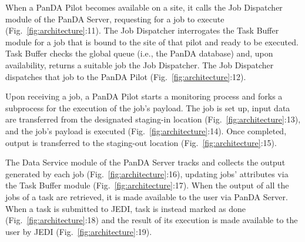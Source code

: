 
When a PanDA Pilot becomes available on a site, it calls the Job Dispatcher
module of the PanDA Server, requesting for a job to execute
(Fig.~\ref{fig:architecture}:11). The Job Dispatcher interrogates the Task
Buffer module for a job that is bound to the site of that pilot and ready to be
executed. Task Buffer checks the global queue (i.e., the PanDA database) and,
upon availability, returns a suitable job the Job Dispatcher. The Job Dispatcher
dispatches that job to the PanDA Pilot (Fig.~\ref{fig:architecture}:12).


Upon receiving a job, a PanDA Pilot starts a monitoring process and forks a
subprocess for the execution of the job's payload. The job is set up, input data
are transferred from the designated staging-in location
(Fig.~\ref{fig:architecture}:13), and the job's payload is executed
(Fig.~\ref{fig:architecture}:14). Once completed, output is transferred to the
staging-out location (Fig.~\ref{fig:architecture}:15).


The Data Service module of the PanDA Server tracks and collects the output
generated by each job (Fig.~\ref{fig:architecture}:16), updating jobs'
attributes via the Task Buffer module (Fig.~\ref{fig:architecture}:17). When the
output of all the jobs of a task are retrieved, it is made available to the user
via PanDA Server. When a task is submitted to JEDI, task is instead marked as
done (Fig.~\ref{fig:architecture}:18) and the result of its execution is made
available to the user by JEDI (Fig.~\ref{fig:architecture}:19).

